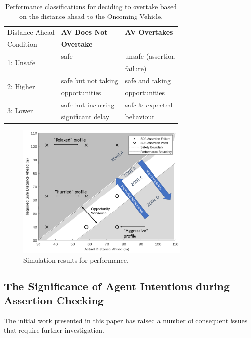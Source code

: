 \begin{table}[]
\centering
\begin{tabular}{|p{2.3cm}|p{2.3cm}|p{2.3cm}|}
\hline
\multicolumn{1}{|l|}{Distance Ahead} & \multicolumn{1}{l|}{\textbf{AV Does Not }} & \multicolumn{1}{l|}{\textbf{AV Overtakes}} \\ 
Condition & \textbf{Overtake} & \\
\hline
\multirow{2}{*}{1: Unsafe} & safe & unsafe (assertion \\
& & failure) \\
\hline
\multirow{2}{*}{2: Higher} & safe but not taking & safe and taking\\ 
      Performance & opportunities & opportunities\\
\hline
\multirow{2}{*}{3: Lower} & safe but incurring  & safe \& expected  \\ 
Performance & significant delay & behaviour\\
\hline
\end{tabular}
\caption{Performance classifications for deciding to overtake based on the distance ahead to the Oncoming Vehicle.}
\label{performance_metric_table}
\end{table}


\begin{figure}[ht!]
    \centering
    \includegraphics[width=8.5cm]{../other/figures/SDA_annotated.png}
    \caption{Simulation results for performance.}
    \label{fig:performance_results}
\end{figure}

\subsection{The Significance of Agent Intentions during Assertion Checking} %
The initial work presented in this paper has raised a number of consequent issues that require further investigation.

